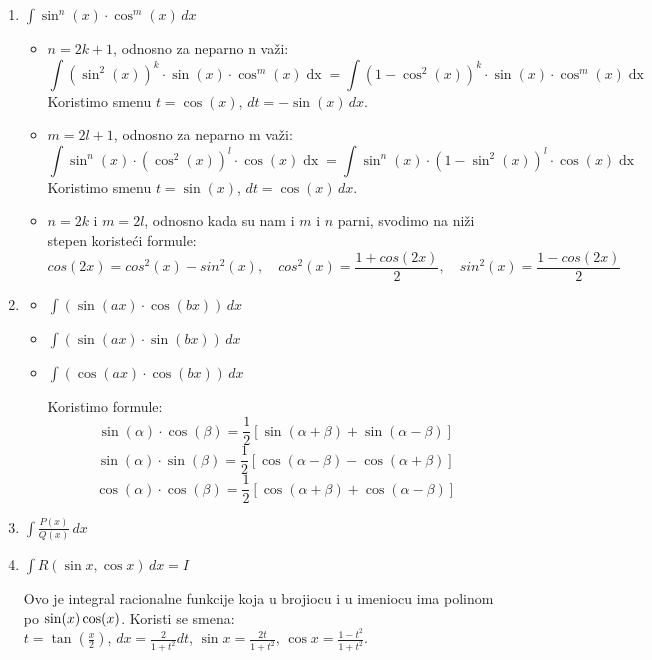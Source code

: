\documentclass[11pt]{article}
\theoremstyle{plain}
\theoremstyle{serbnodot}
\DeclareMathOperator{\dx}{dx}
\begin{document}
\begin{enumerate}
    \item \( \int \sin^n(x) \cdot \cos^m(x) \, dx \)
    
    \begin{itemize}
      \item \( n = 2k + 1 \), odnosno za neparno n važi:
      \[
        \int (\sin^2(x))^k \cdot \sin(x) \cdot \cos^m(x) \dx = \int (1 - \cos^2(x))^k \cdot \sin(x) \cdot \cos^m(x) \dx
      \]
      Koristimo smenu \( t = \cos(x) \), \( dt = -\sin(x) \, dx \).
      \item \( m = 2l + 1 \), odnosno za neparno m važi:
      \[
        \int \sin^n(x) \cdot (\cos^2(x))^l \cdot \cos(x) \dx = \int \sin^n(x) \cdot (1 - \sin^2(x))^l \cdot \cos(x) \dx
      \]
      Koristimo smenu \( t = \sin(x) \), \( dt = \cos(x) \, dx \).
      \item \( n = 2k \) i \( m = 2l \), odnosno kada su nam i $m$ i $n$ parni, svodimo na niži stepen koristeći formule:
      \[
        cos(2x) = cos^2(x) - sin^2(x), \quad cos^2(x) = \frac{1 + cos(2x)}{2}, \quad sin^2(x) = \frac{1 - cos(2x)}{2}
      \]
    \end{itemize}

    \item 
      \begin{itemize}
        \item  \( \int(\sin(ax) \cdot \cos(bx)) \, dx \)
        \item  \( \int(\sin(ax) \cdot \sin(bx)) \, dx \)
        \item  \( \int(\cos(ax) \cdot \cos(bx)) \, dx \)
        
        Koristimo formule:
        \[
          \sin(\alpha) \cdot \cos(\beta) = \frac{1}{2} [\sin(\alpha + \beta) + \sin(\alpha - \beta)]
        \]
        \[
          \sin(\alpha) \cdot \sin(\beta) = \frac{1}{2} [\cos(\alpha - \beta) - \cos(\alpha + \beta)]
        \]
        \[
          \cos(\alpha) \cdot \cos(\beta) = \frac{1}{2} [\cos(\alpha + \beta) + \cos(\alpha - \beta)]
        \]

      \end{itemize}

      \item  \( \int\frac{P(x)}{Q(x)} \, dx \) 
    
      \item  \( \int R(\sin x, \cos x) \, dx = I\)

      Ovo je integral racionalne funkcije koja u brojiocu i u imeniocu ima polinom po \( \sin(x) \\
      \cos(x)\).
      Koristi se smena: \\ 
      \( t = \tan\left(\frac{x}{2}\right) \), \( dx = \frac{2}{1+t^2} dt \), \( \sin x = \frac{2t}{1+t^2} \), \( \cos x = \frac{1-t^2}{1+t^2} \).


\end{enumerate}
\end{document}
